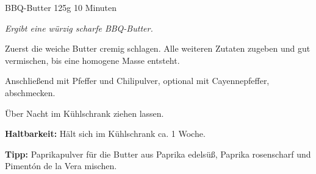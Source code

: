\begin{recipe}{BBQ-Butter} {125g} {10 Minuten}

\freeform
\textit{Ergibt eine würzig scharfe BBQ-Butter.}


Zuerst die weiche Butter cremig schlagen.
Alle weiteren Zutaten zugeben und gut vermischen, bis eine homogene Masse entsteht.


Anschließend mit Pfeffer und Chilipulver, optional mit Cayennepfeffer, abschmecken.

\newstep
Über Nacht im Kühlschrank ziehen lassen.

\freeform
\hrulefill

\freeform 
\textbf{Haltbarkeit:}
Hält sich im Kühlschrank ca. 1 Woche.

\freeform 
\textbf{Tipp:}
Paprikapulver für die Butter aus Paprika edelsüß, Paprika rosenscharf und Pimentón de la Vera mischen.

\end{recipe}
